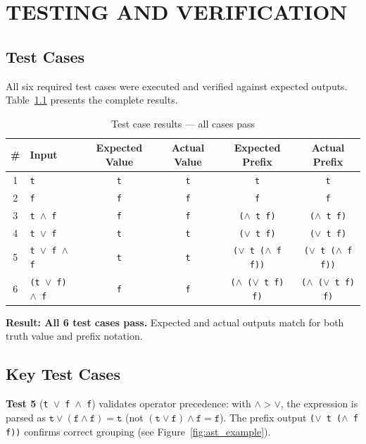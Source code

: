 \chapter{TESTING AND VERIFICATION}

\section{Test Cases}

All six required test cases were executed and verified against expected outputs. Table~\ref{table:test_results} presents the complete results.

\begin{table}[H]
\centering
\caption{Test case results --- all cases pass}
\label{table:test_results}
\begin{tabular}{@{}clcccc@{}}
\toprule
\# & Input & Expected Value & Actual Value & Expected Prefix & Actual Prefix \\
\midrule
1 & \texttt{t}                          & \texttt{t} & \texttt{t} & \texttt{t}                              & \texttt{t} \\
2 & \texttt{f}                          & \texttt{f} & \texttt{f} & \texttt{f}                              & \texttt{f} \\
3 & \texttt{t $\wedge$ f}               & \texttt{f} & \texttt{f} & \texttt{($\wedge$ t f)}                 & \texttt{($\wedge$ t f)} \\
4 & \texttt{t $\vee$ f}                 & \texttt{t} & \texttt{t} & \texttt{($\vee$ t f)}                   & \texttt{($\vee$ t f)} \\
5 & \texttt{t $\vee$ f $\wedge$ f}      & \texttt{t} & \texttt{t} & \texttt{($\vee$ t ($\wedge$ f f))}      & \texttt{($\vee$ t ($\wedge$ f f))} \\
6 & \texttt{(t $\vee$ f) $\wedge$ f}    & \texttt{f} & \texttt{f} & \texttt{($\wedge$ ($\vee$ t f) f)}      & \texttt{($\wedge$ ($\vee$ t f) f)} \\
\bottomrule
\end{tabular}
\end{table}

\textbf{Result: All 6 test cases pass.} Expected and actual outputs match for both truth value and prefix notation.

\section{Key Test Cases}

\textbf{Test 5} (\texttt{t $\vee$ f $\wedge$ f}) validates operator precedence: with $\wedge > \vee$, the expression is parsed as $\texttt{t} \vee (\texttt{f} \wedge \texttt{f}) = \texttt{t}$ (not $(\texttt{t} \vee \texttt{f}) \wedge \texttt{f} = \texttt{f}$). The prefix output \texttt{($\vee$ t ($\wedge$ f f))} confirms correct grouping (see Figure~\ref{fig:ast_example}).

